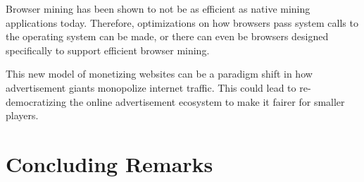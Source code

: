 Browser mining has been shown to not be as efficient as native mining applications today. Therefore, optimizations on how browsers pass system calls to the operating system can be made, or there can even be browsers designed specifically to support efficient browser mining. 

This new model of monetizing websites can be a paradigm shift in how advertisement giants monopolize internet traffic. This could lead to re-democratizing the online advertisement ecosystem to make it fairer for smaller players.


\section{Concluding Remarks}



















